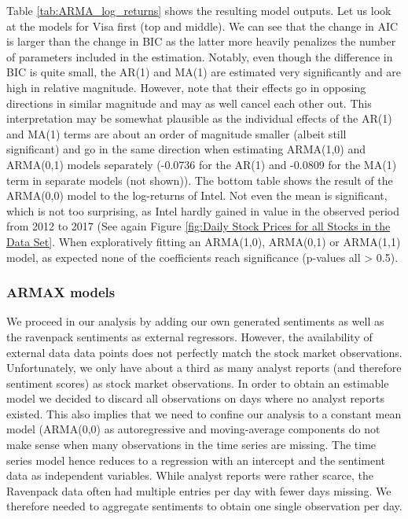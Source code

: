 Table \ref{tab:ARMA_log_returns} shows the resulting model outputs. Let us look at the models for Visa first (top and middle). We can see that the change in AIC is larger than the change in BIC as the latter more heavily penalizes the number of parameters included in the estimation. Notably, even though the difference in BIC is quite small, the AR(1) and MA(1) are estimated very significantly and are high in relative magnitude. However, note that their effects go in opposing directions in similar magnitude and may as well cancel each other out. This interpretation may be somewhat plausible as the individual effects of the AR(1) and MA(1) terms are about an order of magnitude smaller (albeit still significant) and go in the same direction when estimating ARMA(1,0) and ARMA(0,1) models separately (-0.0736 for the AR(1) and -0.0809 for the MA(1) term in separate models (not shown)). 
The bottom table shows the result of the ARMA(0,0) model to the log-returns of Intel. Not even the mean is significant, which is not too surprising, as Intel hardly gained in value in the observed period from 2012 to 2017 (See again Figure \ref{fig:Daily Stock Prices for all Stocks in the Data Set}. When exploratively fitting an ARMA(1,0), ARMA(0,1) or ARMA(1,1) model, as expected none of the coefficients reach significance (p-values all > 0.5). 

\subsubsection{ARMAX models}
We proceed in our analysis by adding our own generated sentiments as well as the ravenpack sentiments as external regressors. However, the availability of external data data points does not perfectly match the stock market observations. Unfortunately, we only have about a third as many analyst reports (and therefore sentiment scores) as stock market observations. In order to obtain an estimable model we decided to discard all observations on days where no analyst reports existed. This also implies that we need to confine our analysis to a constant mean model (ARMA(0,0) as autoregressive and moving-average components do not make sense when many observations in the time series are missing. The time series model hence reduces to a regression with an intercept and the sentiment data as independent variables. While analyst reports were rather scarce, the Ravenpack data often had multiple entries per day with fewer days missing. We therefore needed to aggregate sentiments to obtain one single observation per day. 

